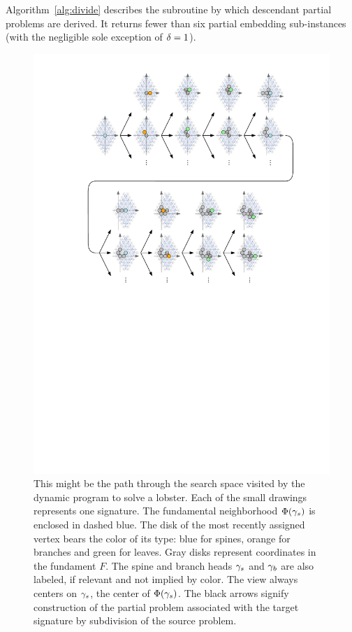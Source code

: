 Algorithm~\ref{alg:divide} describes the subroutine by which descendant partial problems are derived. It returns fewer than six partial embedding sub-instances (with the negligible sole exception of $\delta = 1$).

\begin{figure}
    \centering
    \includegraphics{graphics/ch4_dpexample.pdf}
    \caption[Dynamic program example]{This might be the path through the search space visited by the dynamic program to solve a lobster. Each of the small drawings represents one signature. The fundamental neighborhood $\Phi(\gamma_s)$ is enclosed in dashed blue. The disk of the most recently assigned vertex bears the color of its type: blue for spines, orange for branches and green for leaves. Gray disks represent coordinates in the fundament $F$. The spine and branch heads $\gamma_s$ and $\gamma_b$ are also labeled, if relevant and not implied by color. The view always centers on $\gamma_s$, the center of $\Phi(\gamma_s)$. The black arrows signify construction of the partial problem associated with the target signature by subdivision of the source problem.}
    \label{fig:ch4_dpexample}
\end{figure}

